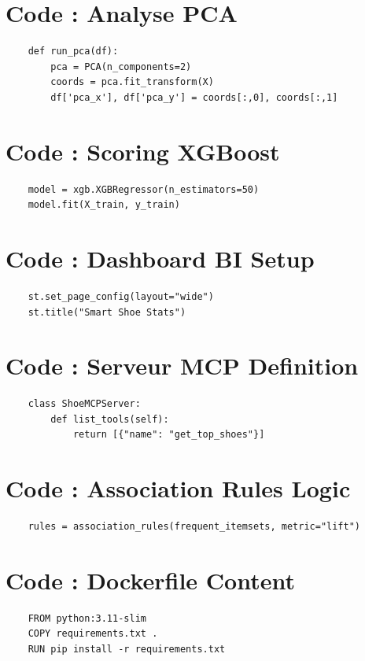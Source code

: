 \documentclass[11pt,a4paper,oneside]{report}
\begin{document}
    \section{Code : Analyse PCA}
    \begin{lstlisting}
    def run_pca(df):
        pca = PCA(n_components=2)
        coords = pca.fit_transform(X)
        df['pca_x'], df['pca_y'] = coords[:,0], coords[:,1]
    \end{lstlisting}

    \section{Code : Scoring XGBoost}
    \begin{lstlisting}
    model = xgb.XGBRegressor(n_estimators=50)
    model.fit(X_train, y_train)
    \end{lstlisting}

    \section{Code : Dashboard BI Setup}
    \begin{lstlisting}
    st.set_page_config(layout="wide")
    st.title("Smart Shoe Stats")
    \end{lstlisting}

    \section{Code : Serveur MCP Definition}
    \begin{lstlisting}
    class ShoeMCPServer:
        def list_tools(self):
            return [{"name": "get_top_shoes"}]
    \end{lstlisting}

    \section{Code : Association Rules Logic}
    \begin{lstlisting}
    rules = association_rules(frequent_itemsets, metric="lift")
    \end{lstlisting}

    \section{Code : Dockerfile Content}
    \begin{lstlisting}
    FROM python:3.11-slim
    COPY requirements.txt .
    RUN pip install -r requirements.txt
    \end{lstlisting}
\end{document}
